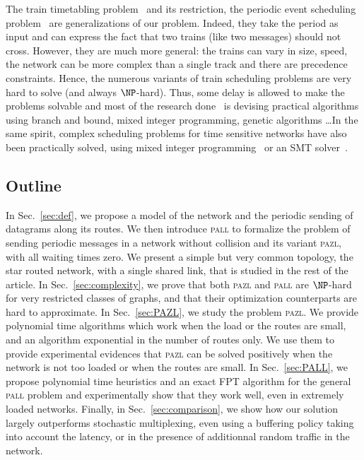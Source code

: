 \documentclass[a4paper,10pt]{article}
\newcommand\pazl{\textsc{pazl}\xspace}
\newcommand\pall{\textsc{pall}\xspace}
\begin{document}
The train timetabling problem~\cite{lusby2011railway} and its restriction, the periodic event scheduling problem~\cite{serafini1989mathematical} are generalizations of our problem. Indeed, they take the period as input and can express the fact that two trains (like two messages) should not cross. However, they are much more general: the trains can vary in size, speed, the network can be more complex than a single track and there are precedence constraints. Hence, the numerous variants of train scheduling problems are very hard to solve (and always $\NP$-hard). Thus, some delay is allowed to make the problems solvable and most of the research done~\cite{lusby2011railway} is devising practical algorithms using branch and bound, mixed integer programming, genetic algorithms \dots  In the same spirit, complex scheduling problems for time sensitive networks have also been practically solved, using mixed integer programming~\cite{nayak2017incremental,steiner2018traffic} or an SMT solver~\cite{dos2019tsnsched}.


\subsection*{Outline}

 In Sec.~\ref{sec:def}, we propose a model of the network and the periodic sending of datagrams along its routes.  We then introduce \pall to formalize the problem of sending periodic messages in a network without collision and its variant \pazl, with all waiting times zero. We present a simple but very common topology, the star routed network, with a single shared link, that is studied in the rest of the article. 
 In Sec.~\ref{sec:complexity}, we prove that both \pazl and \pall are $\NP$-hard for very restricted classes of graphs, and that their optimization counterparts are hard to approximate. 
 In Sec.~\ref{sec:PAZL}, we study the problem \pazl.
 We provide polynomial time algorithms which work when the load or the routes are small, and an algorithm exponential in the number of routes only. We use them to provide experimental evidences that \pazl can be solved positively when the network is not too loaded or when the routes are small. In Sec.~\ref{sec:PALL}, we propose polynomial time heuristics and an exact FPT algorithm for the general \pall problem and experimentally show that they work well, even in extremely loaded networks. 
Finally, in Sec.~\ref{sec:comparison}, we show how our solution largely outperforms stochastic multiplexing, even using a buffering policy taking into account the latency, or in the presence of additionnal random traffic in the network.
\end{document}

